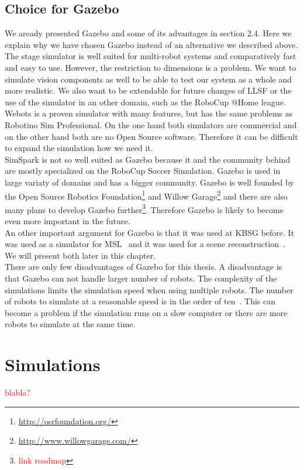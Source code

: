 \subsection{Choice for Gazebo}
We aready presented Gazebo and some of its advantages in section 2.4. Here we explain why we have chosen Gazebo instead of an alternative we described above.\\
The stage simulator is well suited for multi-robot systems and comparatively fast and easy to use. However, the restriction to dimensions is a problem. We want to simulate vision components as well to be able to test our system as a whole and more realistic. We also want to be extendable for future changes of LLSF or the use of the simulator in an other domain, such as the RoboCup @Home league.\\
Webots is a proven simulator with many features, but has the same problems as Robotino Sim Professional. On the one hand both simulators are commercial and on the other hand both are no Open Source software. Therefore it can be difficult to expand the simulation how we need it.\\
SimSpark is not so well suited as Gazebo because it and the community behind are mostly specialized on the RoboCup Soccer Simulation. Gazebo is used in large variaty of domains and has a bigger community. Gazebo is well founded by the Open Source Robotics Foundation\footnote{\url{http://osrfoundation.org/}} and Willow Garage\footnote{\url{http://www.willowgarage.com/}} and there are also many plans to develop Gazebo further\footnote{\textcolor{red}{link roadmap}}. Therefore Gazebo is likely to become even more important in the future.\\
An other important argument for Gazebo is that it was used at KBSG before. It was used as a simulator for MSL~\cite{MultiLevelAbstraction} and it was used for a scene reconstruction~\cite{KlingenDA}. We will present both later in this chapter.\\
There are only few disadvantages of Gazebo for this thesis. A disadvantage is that Gazebo can not handle larger number of robots. The complexity of the simulations limits the simulation speed when using multiple robots. The number of robots to simulate at a reasonable speed is in the order of ten~\cite{GazeboDesign}. This can become a problem if the simulation runs on a slow computer or there are more robots to simulate at the same time.

\section{Simulations}
\textcolor{red}{blabla?}
